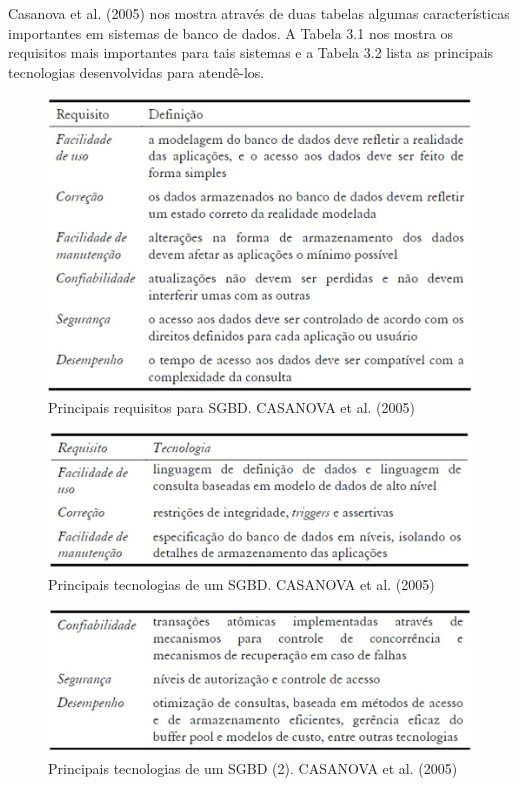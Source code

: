 		Casanova et al. (2005) nos mostra através de duas tabelas algumas características importantes em sistemas de banco de dados. A Tabela 3.1 nos mostra os requisitos mais importantes para tais sistemas e a Tabela 3.2 lista as principais tecnologias desenvolvidas para atendê-los.
		
		\begin{figure}
			\centering
			\includegraphics[width=1\linewidth]{data/requisitos_SGBD}
			\caption{Principais requisitos para SGBD. CASANOVA et al. (2005)}
			\label{fig:requisitossgbd}
		\end{figure}
		
		
		\begin{figure}
			\centering
			\includegraphics[width=1\linewidth]{data/princ_tec_SGBD_1}
			\caption{Principais tecnologias de um SGBD. CASANOVA et al. (2005)}
			\label{fig:princtecsgbd1}
		\end{figure}
		
		\begin{figure}
			\centering
			\includegraphics[width=1\linewidth]{data/princ_tec_SGBD_2}
			\caption{Principais tecnologias de um SGBD (2). CASANOVA et al. (2005)}
			\label{fig:princtecsgbd2}
		\end{figure}
		
